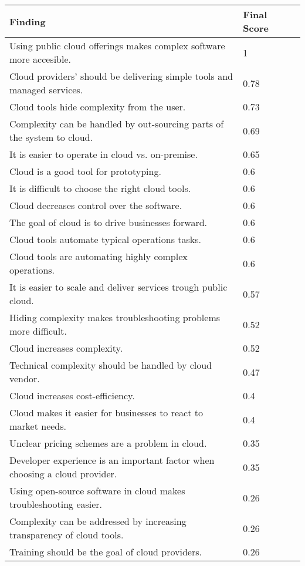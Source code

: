 
\renewcommand\arraystretch{1.5}%
\begin{longtable}{|p{10cm}|p{2cm}|p{2cm}|}
\hline
\textbf{Finding} & \textbf{Final Score} \\ \hline
\endhead
Using public cloud offerings makes complex software more accesible. & 1 \\ \hline
Cloud providers' should be delivering simple tools and managed services. & 0.78 \\ \hline
Cloud tools hide complexity from the user. & 0.73 \\ \hline
Complexity can be handled by out-sourcing parts of the system to cloud. & 0.69 \\ \hline
It is easier to operate in cloud vs. on-premise. & 0.65 \\ \hline
Cloud is a good tool for prototyping. & 0.6 \\ \hline
It is difficult to choose the right cloud tools. & 0.6 \\ \hline
Cloud decreases control over the software. & 0.6 \\ \hline
The goal of cloud is to drive businesses forward. & 0.6 \\ \hline
Cloud tools automate typical operations tasks. & 0.6 \\ \hline
Cloud tools are automating highly complex operations. & 0.6 \\ \hline
It is easier to scale and deliver services trough public cloud. & 0.57 \\ \hline
Hiding complexity makes troubleshooting problems more difficult. & 0.52 \\ \hline
Cloud increases complexity. & 0.52 \\ \hline
Technical complexity should be handled by cloud vendor. & 0.47 \\ \hline
Cloud increases cost-efficiency. & 0.4 \\ \hline
Cloud makes it easier for businesses to react to market needs. & 0.4 \\ \hline
Unclear pricing schemes are a problem in cloud. & 0.35 \\ \hline
Developer experience is an important factor when choosing a cloud provider. & 0.35 \\ \hline
Using open-source software in cloud makes troubleshooting easier. & 0.26 \\ \hline
Complexity can be addressed by increasing transparency of cloud tools. & 0.26 \\ \hline
Training should be the goal of cloud providers. & 0.26 \\ \hline

\end{longtable}

